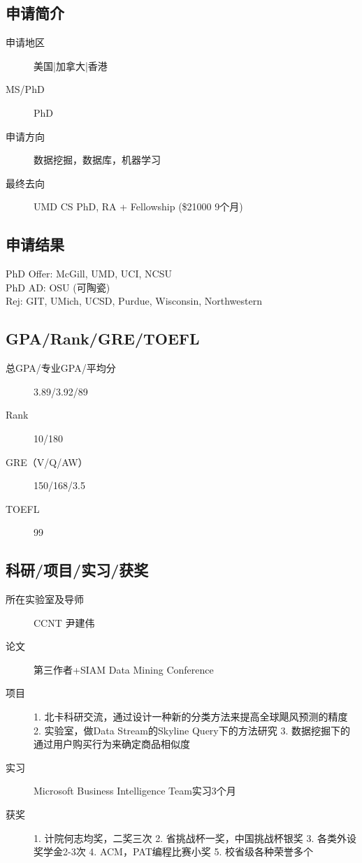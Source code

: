 \documentclass[11pt,fleqn,openany]{book} %
\begin{document}
\noindent\begin{minipage}[t]{0.45\textwidth}
\subsection*{申请简介}
\begin{description}
\item[申请地区] 美国|加拿大|香港
\item[MS/PhD] PhD
\item[申请方向] 数据挖掘，数据库，机器学习
\item[最终去向] UMD CS PhD, RA + Fellowship (\$21000 9个月)
\end{description}
\end{minipage}
\hfill
\begin{minipage}[t]{0.45\textwidth}
\subsection*{申请结果}
\noindent PhD Offer: McGill, UMD, UCI, NCSU\\
PhD AD: OSU (可陶瓷)\\
Rej: GIT, UMich, UCSD, Purdue, Wisconsin, Northwestern
\end{minipage}
\subsection*{GPA/Rank/GRE/TOEFL}
\begin{description}
\item[总GPA/专业GPA/平均分] 3.89/3.92/89
\item[Rank] 10/180
\item[GRE（V/Q/AW）] 150/168/3.5
\item[TOEFL] 99
\end{description}

\subsection*{科研/项目/实习/获奖}
\begin{description}
\item[所在实验室及导师] CCNT 尹建伟
\item[论文] 第三作者+SIAM Data Mining Conference
\item[项目] 1. 北卡科研交流，通过设计一种新的分类方法来提高全球飓风预测的精度
2. 实验室，做Data Stream的Skyline Query下的方法研究
3. 数据挖掘下的通过用户购买行为来确定商品相似度
\item[实习] Microsoft Business Intelligence Team实习3个月
\item[获奖] 1. 计院何志均奖，二奖三次
2. 省挑战杯一奖，中国挑战杯银奖
3. 各类外设奖学金2-3次
4. ACM，PAT编程比赛小奖
5. 校省级各种荣誉多个
\end{description}
\end{document}
